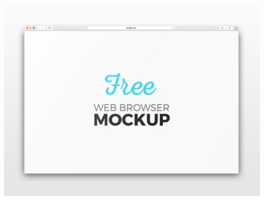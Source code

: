\documentclass[a4paper]{article}
\begin{document}
              \begin{minipage}[c]{\textwidth}
          \centering
          \includegraphics[width=\textwidth]{report/issues/1 - EXAMPLE/issue.jpg}
          \label{1:EXAMPLE:issue.md:issue.jpg}
          \vspace{4ex}
        \end{minipage}
          
    \clearpage

    
\end{document}
